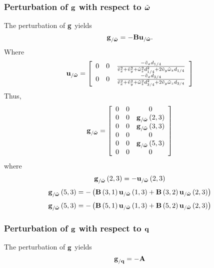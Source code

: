 \subsubsection{Perturbation of $\bm{\mathbf{g}}$ with respect to $\tilde{\bm{\mathbf{\omega}}}$}
The perturbation of $\bm{\mathbf{g}}$ yields
\begin{equation}
\bm{\mathbf{g}}_{/\tilde{\bm{\mathbf{\omega}}}} = 
	-\bm{\mathbf{B}} \bm{\mathbf{u}}_{/\tilde{\bm{\mathbf{\omega}}}}.
\end{equation}
Where
\begin{equation}
	\bm{\mathbf{u}}_{/\tilde{\bm{\mathbf{\omega}}}} = \left[
	\begin{array}{ccc}
	0 & 0 &
	\frac{-\tilde{v}_x d_{1/4}}{\tilde{v}_x^2 + \tilde{v}_y^2 + 
		\tilde{\omega}_z^2 d_{1/4}^2 + 2 \tilde{v}_y \tilde{\omega}_z d_{1/4}} \\
	0 & 0 &
	\frac{-\tilde{v}_x d_{3/4}}{\tilde{v}_x^2 + \tilde{v}_y^2 + 
		\tilde{\omega}_z^2 d_{3/4}^2 + 2 \tilde{v}_y \tilde{\omega}_z d_{3/4}} 
	\end{array}
	\right]
\end{equation}
Thus,
\begin{equation}
	\bm{\mathbf{g}}_{/\tilde{\bm{\mathbf{\omega}}}} = \left[
		\begin{array}{ccc}
			0 & 0 & 0\\
			0 & 0 & \bm{\mathbf{g}}_{/\tilde{\bm{\mathbf{\omega}}}}\left( 2,3 \right) \\
			0 & 0 & \bm{\mathbf{g}}_{/\tilde{\bm{\mathbf{\omega}}}}\left( 3,3 \right) \\
			0 & 0 & 0\\
			0 & 0 & \bm{\mathbf{g}}_{/\tilde{\bm{\mathbf{\omega}}}}\left( 5,3 \right) \\
			0 & 0 & 0
		\end{array} \right]
\end{equation}
where
\begin{equation}
	\bm{\mathbf{g}}_{/\tilde{\bm{\mathbf{\omega}}}}\left( 2,3 \right) = 
		-\bm{\mathbf{u}}_{/\tilde{\bm{\mathbf{\omega}}}}\left( 2,3 \right)
\end{equation} 
\begin{equation}
	\bm{\mathbf{g}}_{/\tilde{\bm{\mathbf{\omega}}}}\left( 5,3 \right) = -\left( 
		\bm{\mathbf{B}}\left( 3,1 \right)\bm{\mathbf{u}}_{/\tilde{\bm{\mathbf{\omega}}}}\left( 1,3 \right) + 
		\bm{\mathbf{B}}\left( 3,2 \right)\bm{\mathbf{u}}_{/\tilde{\bm{\mathbf{\omega}}}}\left( 2,3 \right) \right)
\end{equation} 
\begin{equation}
	\bm{\mathbf{g}}_{/\tilde{\bm{\mathbf{\omega}}}}\left( 5,3 \right) = -\left( 
		\bm{\mathbf{B}}\left( 5,1 \right)\bm{\mathbf{u}}_{/\tilde{\bm{\mathbf{\omega}}}}\left( 1,3 \right) + 
		\bm{\mathbf{B}}\left( 5,2 \right)\bm{\mathbf{u}}_{/\tilde{\bm{\mathbf{\omega}}}}\left( 2,3 \right) \right)
\end{equation} 
			
	


\subsubsection{Perturbation of $\bm{\mathbf{g}}$ with respect to $\bm{\mathbf{q}}$}
The perturbation of $\bm{\mathbf{g}}$ yields
\begin{equation}
\bm{\mathbf{g}}_{/{\bm{\mathbf{q}}}} = -\bm{\mathbf{A}}
\end{equation}
